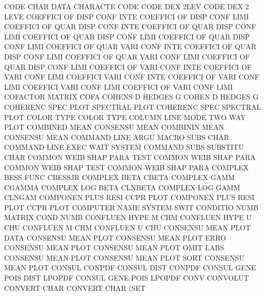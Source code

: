 CODE     CHAR DATA                      CHARACTE CODE
CODE     DEX  2LEV                      CODE     DEX  2    LEVE
COEFFICI OF   DISP CONF INTE            COEFFICI OF   DISP CONF LIMI
COEFFICI OF   QUAR DISP CONF INTE       COEFFICI OF   QUAR DISP CONF LIMI
COEFFICI OF   QUAR DISP CONF LIMI       COEFFICI OF   QUAR DISP CONF LIMI
COEFFICI OF   QUAR VARI CONF INTE       COEFFICI OF   QUAR DISP CONF LIMI
COEFFICI OF   QUAR VARI CONF LIMI       COEFFICI OF   QUAR DISP CONF LIMI
COEFFICI OF   VARI CONF INTE            COEFFICI OF   VARI CONF LIMI
COEFFICI VARI CONF INTE                 COEFFICI OF   VARI CONF LIMI
COEFFICI VARI CONF LIMI                 COEFFICI OF   VARI CONF LIMI
COFACTOR                                MATRIX   COFA
COHENS   D                              HEDGES   G
COHEN    D                              HEDGES   G
COHERENC SPEC PLOT                      SPECTRAL PLOT
COHERENC SPEC                           SPECTRAL PLOT
COLOR    TYPE                           COLOR    TYPE
COLUMN   LINE MODE                      TWO      WAY  PLOT
COMBINED MEAN                           CONSENSU MEAN
COMBININ MEAN                           CONSENSU MEAN
COMMAND  LINE ARGU                      MACRO    SUBS CHAR
COMMAND  LINE EXEC WAIT                 SYSTEM
COMMAND  SUBS                           SUBSTITU CHAR
COMMON   WEIB SHAP PARA TEST            COMMON   WEIB SHAP PARA
COMMON   WEIB SHAP TEST                 COMMON   WEIB SHAP PARA
COMPLEX  BESS FUNC                      CBESSJR
COMPLEX  BETA                           CBETA
COMPLEX  GAMM                           CGAMMA
COMPLEX  LOG BETA                       CLNBETA
COMPLEX  LOG GAMM                       CLNGAM
COMPONEN PLUS RESI                      CCPR     PLOT
COMPONEN PLUS RESI PLOT                 CCPR     PLOT
COMPUTER NAME                           SYSTEM   SWIT
CONDITIO NUMB                           MATRIX   COND NUMB
CONFLUEN HYPE M                         CHM
CONFLUEN HYPE U                         CHU
CONFLUEN M                              CHM
CONFLUEN U                              CHU
CONSENSU MEAN PLOT DATA                 CONSENSU MEAN PLOT
CONSENSU MEAN PLOT ERRO                 CONSENSU MEAN PLOT
CONSENSU MEAN PLOT OMIT LABS            CONSENSU MEAN PLOT
CONSENSU MEAN PLOT SORT                 CONSENSU MEAN PLOT
CONSUL                                  CONPDF
CONSUL   DIST                           CONPDF
CONSUL   GENE POIS DIST                 LPOPDF
CONSUL   GENE POIS                      LPOPDF
CONV                                    CONVOLUT
CONVERT  CHAR                           CONVERT  CHAR (SET
